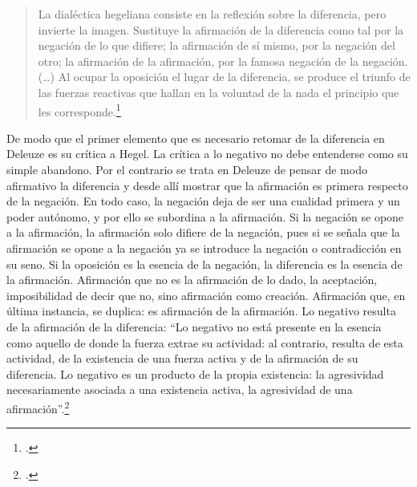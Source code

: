 \documentclass{book}
\begin{document}
\begin{quote}
La dialéctica hegeliana consiste en la reflexión sobre la diferencia,
pero invierte la imagen. Sustituye la afirmación de la diferencia como
tal por la negación de lo que difiere; la afirmación de sí mismo, por la
negación del otro; la afirmación de la afirmación, por la famosa
negación de la negación. (\dots) Al ocupar la oposición el lugar de
la diferencia, se produce el triunfo de las fuerzas reactivas que hallan
en la voluntad de la nada el principio que les corresponde.\footcite[272]{deleuze2005a}
\end{quote}

De modo que el primer elemento que es necesario retomar de la diferencia
en Deleuze es su crítica a Hegel. La crítica a lo negativo no debe
entenderse como su simple abandono. Por el contrario se trata en Deleuze
de pensar de modo afirmativo la diferencia y desde allí mostrar que la
afirmación es primera respecto de la negación. En todo caso, la negación
deja de ser una cualidad primera y un poder autónomo, y por ello se
subordina a la afirmación. Si la negación se opone a la afirmación, la
afirmación solo difiere de la negación, pues si se señala que la
afirmación se opone a la negación ya se introduce la negación o
contradicción en su seno. Si la oposición es la esencia de la negación,
la diferencia es la esencia de la afirmación. Afirmación que no es la
afirmación de lo dado, la aceptación, imposibilidad de decir que no,
sino afirmación como creación. Afirmación que, en última instancia, se
duplica: es afirmación de la afirmación. Lo negativo resulta de la
afirmación de la diferencia: \enquote{Lo negativo no está presente en la esencia
como aquello de donde la fuerza extrae su actividad: al contrario,
resulta de esta actividad, de la existencia de una fuerza activa y de la
afirmación de su diferencia. Lo negativo es un producto de la propia
existencia: la agresividad necesariamente asociada a una existencia
activa, la agresividad de una afirmación}.\footcite[17]{deleuze2005a}
\end{document}
